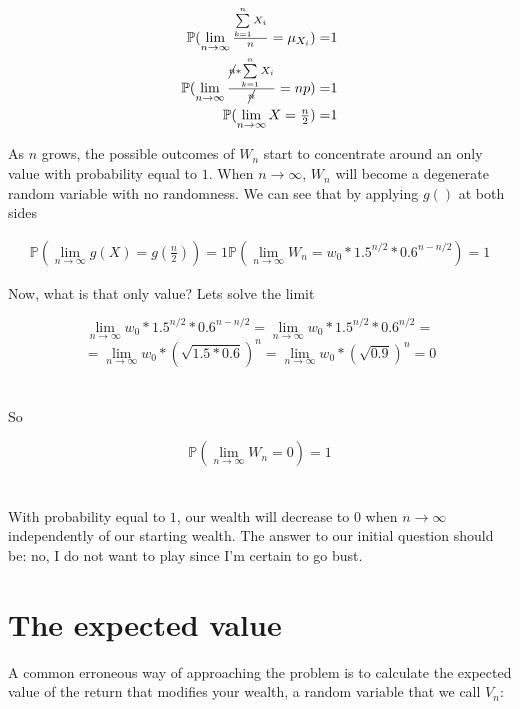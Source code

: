 \documentclass[12pt]{article}
\begin{document}
\begin{equation*}
  \begin{split}
    \mathbb{P}(\lim_{n\to\infty} \tfrac{\sum\limits_{k=1}^{n} X_i}{n} = \mu_{X_i}) =& 1\\
    \mathbb{P}(\lim_{n\to\infty} \tfrac{\cancel{n}*\sum\limits_{k=1}^{n} X_i}{\cancel{n}} = np) =& 1\\
    \mathbb{P}(\lim_{n\to\infty} X = \tfrac{n}{2}) =& 1
  \end{split}
\end{equation*}

As $n$ grows, the possible outcomes of $W_n$ start to concentrate around an only value with probability equal to $1$. When $n \rightarrow \infty$, $W_n$ will become a degenerate random variable with no randomness. We can see that by applying $g()$ at both sides

\begin{equation*}
  \begin{split}
    \mathbb{P}(\lim_{n\to\infty} g(X) = g(\tfrac{n}{2})) = 1
    \mathbb{P}(\lim_{n\to\infty} W_n = w_0 * 1.5^{n/2} * 0.6^{n-n/2}) = 1
    \end{split}
\end{equation*}

Now, what is that only value? Lets solve the limit

\begin{equation*}
  \lim_{n\to\infty} w_0 * 1.5^{n/2} * 0.6^{n-n/2} = \lim_{n\to\infty}w_0 * 1.5^{n/2} * 0.6^{n/2} =
\end{equation*}
\begin{equation*}
    = \lim_{n\to\infty}w_0 * (\sqrt{1.5*0.6})^{n} = \lim_{n\to\infty}w_0 * (\sqrt{0.9}) ^{n} = 0
\end{equation*}
\\\\
So

\begin{equation*}
    \mathbb{P}(\lim_{n\to\infty} W_n = 0) = 1
\end{equation*}
\\\\
With probability equal to $1$, our wealth will decrease to 0 when $n\to\infty$ independently of our starting wealth. The answer to our initial question should be: no, I do not want to play since I'm certain to go bust.

\section{The expected value}
A common erroneous way of approaching the problem is to calculate the expected value of the return that modifies your wealth, a random variable that we call $V_n$:
\end{document}
